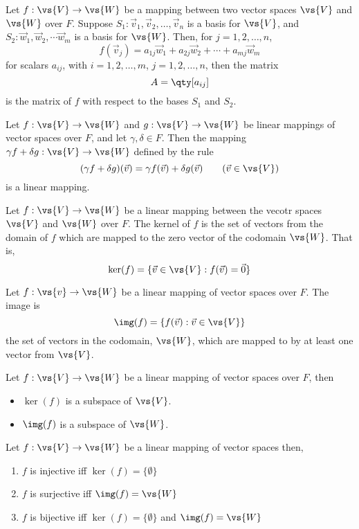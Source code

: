 \begin{definition}
  Let $f:\vs{V} \to \vs{W}$ be a mapping between two vector spaces
  $\vs{V}$ and $\vs{W}$ over $F$. Suppose $S_1: \vec{v}_1, \vec{v}_2,
  \dots, \vec{v}_n$ is a basis for $\vs{V}$, and $S_2: \vec{w}_1,
  \vec{w}_2, \cdots \vec{w}_m$ is a basis for $\vs{W}$.  Then, for $j
  = 1,2, \dots, n$,
  \[ f(\vec{v}_j) = a_{1j} \vec{w}_1 + a_{2j} \vec{w}_2 + \cdots +
  a_{mj} \vec{w}_m \] for scalars $a_{ij}$, with $i = 1,2, \dots, m$,
  $j=1,2, \dots, n$, then the matrix \[ A = \qty[a_{ij}] \] is the
  matrix of $f$ with respect to the bases $S_1$ and $S_2$.
\end{definition}
\begin{lemma}
  Let $f:\vs{V} \to \vs{W}$ and $g:\vs{V}\to \vs{W}$ be linear
  mappings of vector spaces over $F$, and let $\gamma , \delta \in
  F$. Then the mapping $\gamma f + \delta g : \vs{V} \to \vs{W}$
  defined by the rule
  \[ (\gamma f + \delta g)(\vec{v}) = \gamma f(\vec{v}) + \delta
  g(\vec{v}) \qquad (\vec{v} \in \vs{V}) \] is a linear mapping.
\end{lemma}
\begin{definition}
  Let $f:\vs{V} \to \vs{W}$ be a linear mapping between the vecotr
  spaces $\vs{V}$ and $\vs{W}$ over $F$. The kernel of $f$ is the set
  of vectors from the domain of $f$ which are mapped to the zero
  vector of the codomain $\vs{W}$. That is, \[ \ker(f) = \{ \vec{v}
  \in \vs{V} : f(\vec{v}) = \vec{0} \} \]
\end{definition}
\begin{definition}
  Let $f:\vs{v} \to \vs{W}$ be a linear mapping of vector spaces over
  $F$. The image is \[ \img(f) = \{ f(\vec{v}) : \vec{v} \in \vs{V}
  \} \] the set of vectors in the codomain, $\vs{W}$, which are mapped
  to by at least one vector from $\vs{V}$.
\end{definition}
\begin{lemma}
  Let $f: \vs{V} \to \vs{W}$ be a linear mapping of vector spaces over $F$, then
  \begin{itemize}
  \item $\ker(f)$ is a subspace of $\vs{V}$.
  \item $\img(f)$ is a subspace of $\vs{W}$.
  \end{itemize}
\end{lemma}
\begin{lemma}
  Let $f: \vs{V} \to \vs{W}$ be a linear mapping of vector spaces then,
  \begin{enumerate}
  \item $f$ is injective iff $\ker(f) = \{ \emptyset \}$
  \item $f$ is surjective iff $\img(f) = \vs{W}$
  \item $f$ is bijective iff $\ker(f) = \{ \emptyset \}$ and $\img(f) = \vs{W}$
  \end{enumerate}
\end{lemma}
